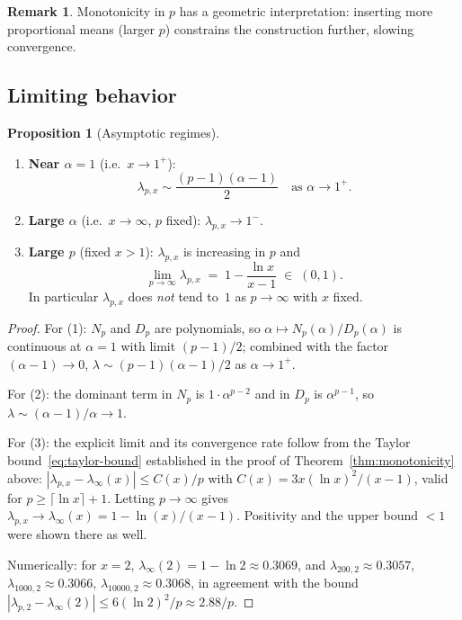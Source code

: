 \documentclass[11pt,a4paper]{article}
\theoremstyle{definition}
\newtheorem{proposition}{Proposition}[section]
\newtheorem{remark}{Remark}[section]
\begin{document}
\begin{remark}
Monotonicity in $p$ has a geometric interpretation: inserting more proportional means (larger $p$) constrains the construction further, slowing convergence.
\end{remark}

\subsection{Limiting behavior}

\begin{proposition}[Asymptotic regimes]
\label{prop:limits}
\mbox{}
\begin{enumerate}
  \item \textbf{Near $\alpha = 1$} (i.e.\ $x \to 1^+$):
  \[
    \lambda_{p,x} \sim \frac{(p-1)(\alpha - 1)}{2} \quad \text{as } \alpha \to 1^+.
  \]
  \item \textbf{Large $\alpha$} (i.e.\ $x \to \infty$, $p$ fixed): $\lambda_{p,x} \to 1^-$.
  \item \textbf{Large $p$} (fixed $x > 1$): $\lambda_{p,x}$ is increasing in $p$ and
  \[
    \lim_{p \to \infty} \lambda_{p,x} \;=\; 1 - \frac{\ln x}{x - 1}
     \;\in\; (0, 1).
  \]
  In particular $\lambda_{p,x}$ does \emph{not} tend to~$1$ as $p \to \infty$ with $x$ fixed.
\end{enumerate}
\end{proposition}

\begin{proof}
For (1): $N_p$ and $D_p$ are polynomials, so $\alpha \mapsto N_p(\alpha)/D_p(\alpha)$ is continuous at $\alpha = 1$ with limit $(p-1)/2$; combined with the factor $(\alpha - 1) \to 0$, $\lambda \sim (p-1)(\alpha-1)/2$ as $\alpha \to 1^+$.

For (2): the dominant term in $N_p$ is $1 \cdot \alpha^{p-2}$ and in $D_p$ is $\alpha^{p-1}$, so $\lambda \sim (\alpha-1)/\alpha \to 1$.

For (3): the explicit limit and its convergence rate follow from the Taylor bound~\eqref{eq:taylor-bound} established in the proof of Theorem~\ref{thm:monotonicity} above:
$|\lambda_{p,x} - \lambda_\infty(x)| \leq C(x)/p$ with $C(x) = 3x(\ln x)^2/(x-1)$, valid for $p \geq \lceil \ln x \rceil + 1$. Letting $p \to \infty$ gives $\lambda_{p,x} \to \lambda_\infty(x) = 1 - \ln(x)/(x-1)$. Positivity and the upper bound $< 1$ were shown there as well.

Numerically: for $x = 2$, $\lambda_\infty(2) = 1 - \ln 2 \approx 0.3069$, and $\lambda_{200,2} \approx 0.3057$, $\lambda_{1000,2} \approx 0.3066$, $\lambda_{10000,2} \approx 0.3068$, in agreement with the bound $|\lambda_{p,2} - \lambda_\infty(2)| \leq 6(\ln 2)^2/p \approx 2.88/p$.
\end{proof}
\end{document}
